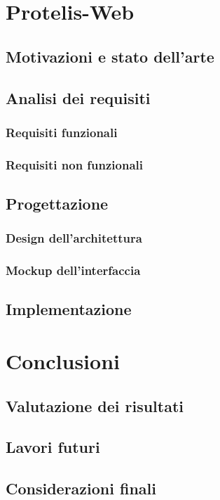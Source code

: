 \documentclass[%
  a4paper,                %
  12pt,                   %
  twoside,                %
  openright,              %
  titlepage,              %
  final                   %
]{scrbook}
\begin{document}
  \chapter{Protelis-Web}
    \section{Motivazioni e stato dell'arte}
    \section{Analisi dei requisiti}
      \subsection{Requisiti funzionali}
      \subsection{Requisiti non funzionali}
    \section{Progettazione}
      \subsection{Design dell'architettura}
      \subsection{Mockup dell'interfaccia}
    \section{Implementazione}


  \chapter{Conclusioni}
    \section{Valutazione dei risultati}
    \section{Lavori futuri}
    \section{Considerazioni finali}
\end{document}
